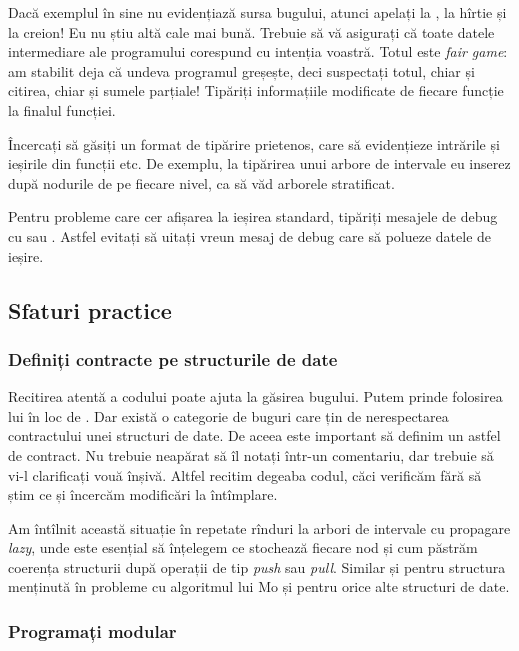 \documentclass[../main.tex]{subfiles}
\begin{document}
Dacă exemplul în sine nu evidențiază sursa bugului, atunci apelați la , la hîrtie și la creion! Eu nu știu altă cale mai bună. Trebuie să vă asigurați că toate datele intermediare ale programului corespund cu intenția voastră. Totul este \textit{fair game}: am stabilit deja că undeva programul greșește, deci suspectați totul, chiar și citirea, chiar și sumele parțiale! Tipăriți informațiile modificate de fiecare funcție la finalul funcției.

Încercați să găsiți un format de tipărire prietenos, care să evidențieze intrările și ieșirile din funcții etc. De exemplu, la tipărirea unui arbore de intervale eu inserez  după nodurile de pe fiecare nivel, ca să văd arborele stratificat.

Pentru probleme care cer afișarea la ieșirea standard, tipăriți mesajele de debug cu  sau . Astfel evitați să uitați vreun mesaj de debug care să polueze datele de ieșire.


\subsection{Sfaturi practice}

\subsubsection*{Definiți contracte pe structurile de date}

Recitirea atentă a codului poate ajuta la găsirea bugului. Putem prinde folosirea lui  în loc de . Dar există o categorie de buguri care țin de nerespectarea contractului unei structuri de date. De aceea este important să definim un astfel de contract. Nu trebuie neapărat să îl notați într-un comentariu, dar trebuie să vi-l clarificați vouă înșivă. Altfel recitim degeaba codul, căci verificăm fără să știm ce și încercăm modificări la întîmplare.

Am întîlnit această situație în repetate rînduri la arbori de intervale cu propagare \textit{lazy}, unde este esențial să înțelegem ce stochează fiecare nod și cum păstrăm coerența structurii după operații de tip \textit{push} sau \textit{pull}. Similar și pentru structura menținută în probleme cu algoritmul lui Mo și pentru orice alte structuri de date.

\subsubsection*{Programați modular}
\end{document}

